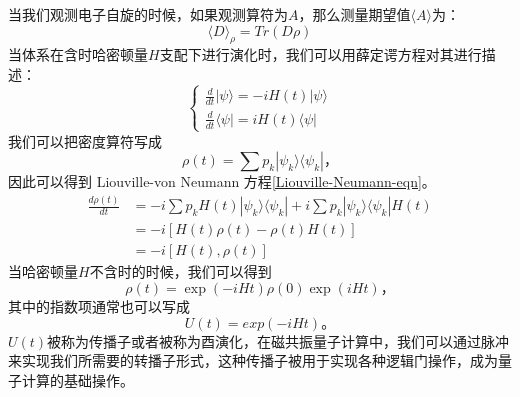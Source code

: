         当我们观测电子自旋的时候，如果观测算符为$A$，那么测量期望值$\langle A\rangle$为：
            \begin{equation}
            \label{detection}
            \langle D\rangle_\rho = Tr(D\rho)
            \end{equation}
        当体系在含时哈密顿量$H$支配下进行演化时，我们可以用薛定谔方程对其进行描述：
            \begin{equation}
                \left\{ \begin{aligned}
                            \frac{d}{dt}|\psi\rangle = - i H(t)|\psi\rangle\\
                            \frac{d}{dt}\langle\psi| =  i H(t)\langle\psi|
                        \end{aligned}
                \right.
            \end{equation}
        我们可以把密度算符写成
            \begin{equation}
            \rho(t)= \sum p_k|\psi_k \rangle \langle \psi_k|，
            \end{equation}
        因此可以得到 Liouville-von Neumann 方程\ref{Liouville-Neumann-eqn}。
            \begin{equation}
            \label{Liouville-Neumann-eqn}
                \begin{split}
                    \frac{d\rho(t)}{dt} & = -i\sum p_k H(t)|\psi_k \rangle\langle\psi_k| + i\sum p_k |\psi_k \rangle\langle\psi_k| H(t)\\
                                        & = -i[H(t)\rho(t) -\rho(t) H(t)]\\
                                        & = -i[H(t),\rho(t)]
                \end{split}
            \end{equation}
        当哈密顿量$H$不含时的时候，我们可以得到
            \begin{equation}
            \rho(t)=\exp(-iHt)\rho(0)\exp(iHt)，
            \end{equation}
        其中的指数项通常也可以写成
            \begin{equation}
            \label{U-operation}
            U(t)=exp(-iHt)。
            \end{equation}
        $U(t)$被称为传播子或者被称为酉演化，在磁共振量子计算中，我们可以通过脉冲来实现我们所需要的转播子形式\cite{NMR-review}，这种传播子被用于实现各种逻辑门操作，成为量子计算的基础操作。


